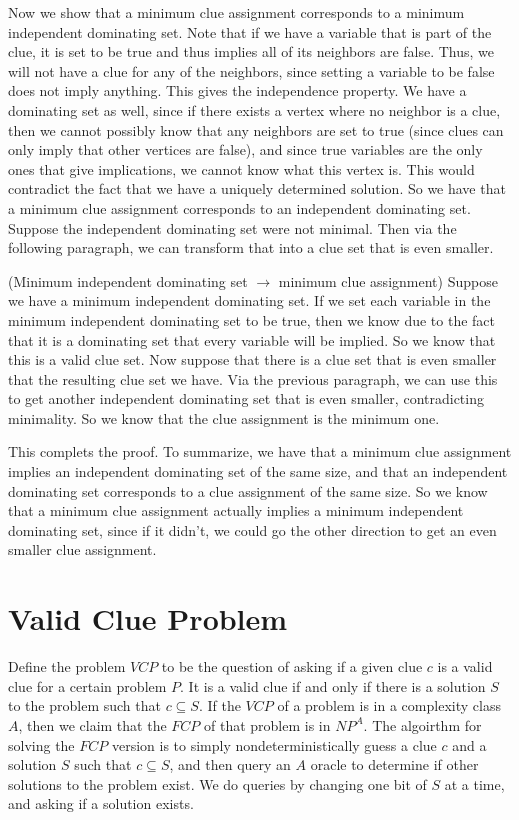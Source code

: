 \documentclass[11pt]{article}
\begin{document}
Now we show that a minimum clue assignment corresponds to a minimum independent dominating set. Note that if we have a variable that is part of the clue, it is set to be true and thus implies all of its neighbors are false. Thus, we will not have a clue for any of the neighbors, since setting a variable to be false does not imply anything. This gives the independence property. We have a dominating set as well, since if there exists a vertex where no neighbor is a clue, then we cannot possibly know that any neighbors are set to true (since clues can only imply that other vertices are false), and since true variables are the only ones that give implications, we cannot know what this vertex is. This would contradict the fact that we have a uniquely determined solution. So we have that a minimum clue assignment corresponds to an independent dominating set. Suppose the independent dominating set were not minimal. Then via the following paragraph, we can transform that into a clue set that is even smaller.

(Minimum independent dominating set $\to$ minimum clue assignment) Suppose we have a minimum independent dominating set. If we set each variable in the minimum independent dominating set to be true, then we know due to the fact that it is a dominating set that every variable will be implied. So we know that this is a valid clue set. Now suppose that there is a clue set that is even smaller that the resulting clue set we have. Via the previous paragraph, we can use this to get another independent dominating set that is even smaller, contradicting minimality. So we know that the clue assignment is the minimum one.  

This complets the proof. To summarize, we have that a minimum clue assignment implies an independent dominating set of the same size, and that an independent dominating set corresponds to a clue assignment of the same size. So we know that a minimum clue assignment actually implies a minimum independent dominating set, since if it didn't, we could go the other direction to get an even smaller clue assignment.

\section{Valid Clue Problem}

Define the problem $VCP$ to be the question of asking if a given clue $c$ is a valid clue for a certain problem $P$. It is a valid clue if and only if there is a solution $S$ to the problem such that $c \subseteq S$. If the $VCP$ of a problem is in a complexity class $A$, then we claim that the $FCP$ of that problem is in $NP^A$. The algoirthm for solving the $FCP$ version is to simply nondeterministically guess a clue $c$ and a solution $S$ such that $c \subseteq S$, and then query an $A$ oracle to determine if other solutions to the problem exist. We do queries by changing one bit of $S$ at a time, and asking if a solution exists.
\end{document}
